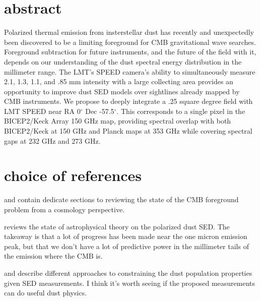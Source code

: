\documentclass[12pt]{article}
\begin{document}
\newcommand{\araa}{Annual Review of Astron and Astrophys}
\newcommand{\aap}{Astronomy and Astrophysics}
\newcommand{\apj}{Astrophysical Journal}

\section*{abstract}

Polarized thermal emission from insterstellar dust has recently and unexpectedly been discovered to be a limiting foreground for CMB gravitational wave searches. Foreground subtraction for future instruments, and the future of the field with it, depends on our understanding of the dust spectral energy distribution in the millimeter range. The LMT's SPEED camera's ability to simultaneously measure 2.1, 1.3, 1.1, and .85 mm intensity with a large collecting area provides an opportunity to improve dust SED models over sightlines already mapped by CMB instruments. We propose to deeply integrate a .25 square degree field with LMT SPEED near RA 0\(^\circ\) Dec -57.5\(^\circ\). This corresponds to a single pixel in the BICEP2/Keck Array 150 GHz map, providing spectral overlap with both BICEP2/Keck at 150 GHz and Planck maps at 353 GHz while covering spectral gaps at 232 GHz and 273 GHz.


\section*{choice of references}

\cite{bicep_planck} and \cite{planck_dust} contain dedicate sections to reviewing the state of the CMB foreground problem from a cosmology perspective.

\cite{andersson} reviews the state of astrophysical theory on the polarized dust SED. The takeaway is that a lot of progress has been made near the one micron emission peak, but that we don't have a lot of predictive power in the millimeter tails of the emission where the CMB is.

\cite{compiegne} and \cite{draine_li} describe different approaches to constraining the dust population properties given SED measurements. I think it's worth seeing if the proposed measurements can do useful dust physics.




\end{document}
